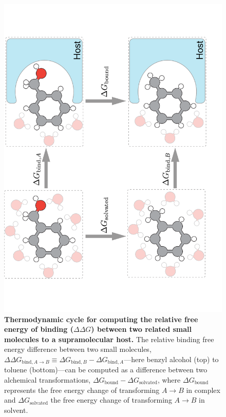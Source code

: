 \documentclass[9pt,bestpractices]{livecoms}
\begin{document}
\begin{figure}
    \includegraphics[width=0.95\linewidth,angle=270]{paper/figures/fig2/Fig2.pdf}
    \caption{{\bf Thermodynamic cycle for computing the relative free energy of binding ($\Delta \Delta G$) between two related small molecules to a supramolecular host.}
    The relative binding free energy difference between two small molecules, $\Delta \Delta G_{\mathrm{bind}, A \rightarrow B} \equiv \Delta G_{\mathrm{bind}, B} - \Delta G_{\mathrm{bind}, A}$---here benzyl alcohol (top) to toluene (bottom)---can be computed as a difference between two alchemical transformations, $\Delta G_\mathrm{bound} - \Delta G_\mathrm{solvated}$, where $\Delta G_\mathrm{bound}$ represents the free energy change of transforming $A \rightarrow B$ in complex and $\Delta G_\mathrm{solvated}$ the free energy change of transforming $A \rightarrow B$ in solvent.}
    \label{fig:fig1}
\end{figure}
\end{document}
